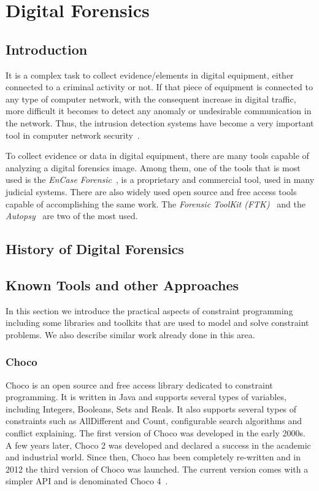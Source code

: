 \chapter{Digital Forensics}

\section{Introduction}

It is a complex task to collect evidence/elements in digital equipment, either connected to a criminal activity or not. If that piece of equipment is connected to any type of computer network, with the consequent increase in digital traffic, more difficult it becomes to detect any anomaly or undesirable communication in the network. Thus, the intrusion detection systems have become a very important tool in computer network security~\cite{Salgueiro2011}. 

To collect evidence or data in digital equipment, there are many tools capable of analyzing a digital forensics image. Among them, one of the tools that is most used is the \textit{EnCase Forensic}~\cite{EnCase}, is a proprietary and commercial tool, used in many judicial systems. There are also widely used open source and free access tools capable of accomplishing the same work. The \textit{Forensic ToolKit (FTK)}~\cite{FTK} and the \textit{Autopsy}~\cite{Autopsy} are two of the most used.

\section{History of Digital Forensics}

\section{Known Tools and other Approaches}

In this section we introduce the practical aspects of constraint programming including some libraries and toolkits that are used to model and solve constraint problems. We also describe similar work already done in this area.

\subsection{Choco}

Choco is an open source and free access library dedicated to constraint programming. It is written in Java and supports several types of variables, including Integers, Booleans, Sets and Reals. It also supports several types of constraints such as AllDifferent and Count, configurable search algorithms and conflict explaining. The first version of Choco was developed in the early 2000s. A few years later, Choco 2 was developed and declared a success in the academic and industrial world. Since then, Choco has been completely re-written and in 2012 the third version of Choco was launched. The current version comes with a simpler API and is denominated Choco 4~\cite{chocoSolver}.

